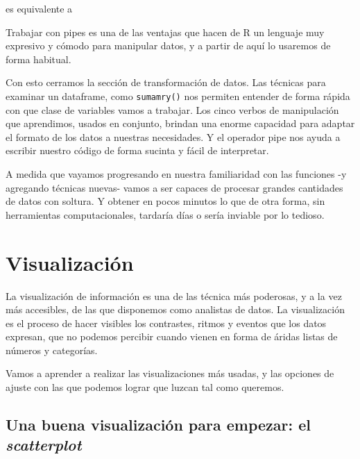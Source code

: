 \documentclass[spanish,]{book}
\newenvironment{Shaded}{\begin{snugshade}}{\end{snugshade}}
\newcommand{\DecValTok}[1]{\textcolor[rgb]{0.00,0.00,0.81}{#1}}
\newcommand{\KeywordTok}[1]{\textcolor[rgb]{0.13,0.29,0.53}{\textbf{#1}}}
\newcommand{\NormalTok}[1]{#1}
\newcommand{\OperatorTok}[1]{\textcolor[rgb]{0.81,0.36,0.00}{\textbf{#1}}}
\newcommand{\StringTok}[1]{\textcolor[rgb]{0.31,0.60,0.02}{#1}}
\begin{document}
es equivalente a

\begin{Shaded}
\end{Shaded}

Trabajar con pipes es una de las ventajas que hacen de R un lenguaje muy expresivo y cómodo para manipular datos, y a partir de aquí lo usaremos de forma habitual.

Con esto cerramos la sección de transformación de datos. Las técnicas para examinar un dataframe, como \texttt{sumamry()} nos permiten entender de forma rápida con que clase de variables vamos a trabajar. Los cinco verbos de manipulación que aprendimos, usados en conjunto, brindan una enorme capacidad para adaptar el formato de los datos a nuestras necesidades. Y el operador pipe nos ayuda a escribir nuestro código de forma sucinta y fácil de interpretar.

A medida que vayamos progresando en nuestra familiaridad con las funciones -y agregando técnicas nuevas- vamos a ser capaces de procesar grandes cantidades de datos con soltura. Y obtener en pocos minutos lo que de otra forma, sin herramientas computacionales, tardaría días o sería inviable por lo tedioso.

\hypertarget{visualizacion}{%
\chapter{Visualización}\label{visualizacion}}

La visualización de información es una de las técnica más poderosas, y a la vez más accesibles, de las que disponemos como analistas de datos. La visualización es el proceso de hacer visibles los contrastes, ritmos y eventos que los datos expresan, que no podemos percibir cuando vienen en forma de áridas listas de números y categorías.

Vamos a aprender a realizar las visualizaciones más usadas, y las opciones de ajuste con las que podemos lograr que luzcan tal como queremos.

\hypertarget{una-buena-visualizacion-para-empezar-el-scatterplot}{%
\section{\texorpdfstring{Una buena visualización para empezar: el \emph{scatterplot}}{Una buena visualización para empezar: el scatterplot}}\label{una-buena-visualizacion-para-empezar-el-scatterplot}}
\end{document}
